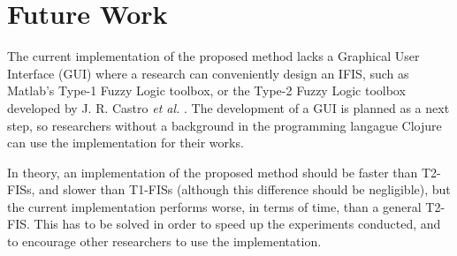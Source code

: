 \documentclass[conference]{IEEEtran}
\begin{document}
\section{Future Work}
\label{future-work}

The current implementation of the proposed method lacks a Graphical User
Interface (GUI) where a research can conveniently design an IFIS, such as
Matlab's Type-1 Fuzzy Logic toolbox, or the Type-2 Fuzzy Logic toolbox
developed by J. R. Castro \textit{et al.} \cite{castro2007interval}. The
development of a GUI is planned as a next step, so researchers without
a background in the programming langague Clojure can use the
implementation for their works.

In theory, an implementation of the proposed method should be faster
than T2-FISs, and slower than T1-FISs (although this difference should
be negligible), but the current implementation performs worse, in
terms of time, than a general T2-FIS. This has to be solved in order
to speed up the experiments conducted, and to encourage other
researchers to use the implementation.



\end{document}
